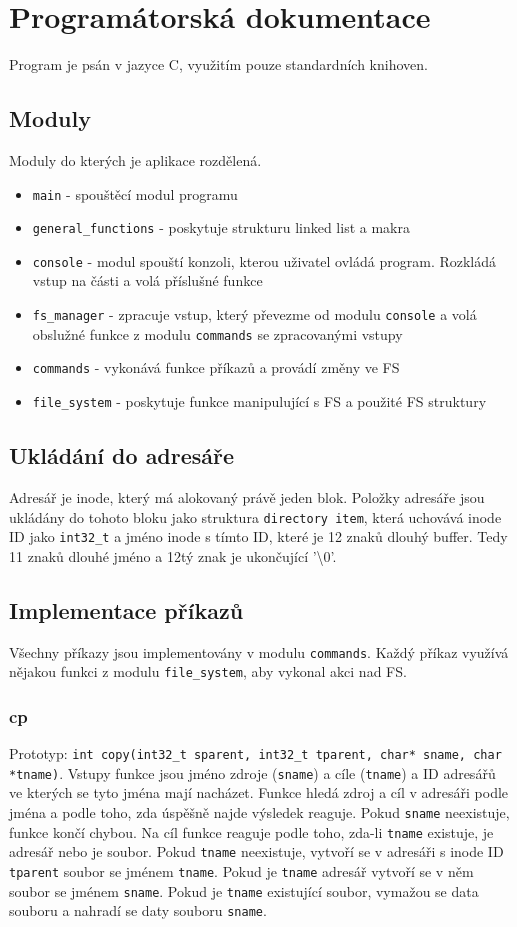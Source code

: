 \documentclass[12pt]{report}
\begin{document}
\chapter{Programátorská dokumentace}
Program je psán v jazyce C, využitím pouze standardních knihoven.
%
\section{Moduly}
Moduly do kterých je aplikace rozdělená.
\begin{itemize}
	\item \texttt{main} - spouštěcí modul programu
	\item \texttt{general\_functions} - poskytuje strukturu linked list a makra
	\item \texttt{console} - modul spouští konzoli, kterou uživatel ovládá program.
		Rozkládá vstup na části a volá příslušné funkce
	\item \texttt{fs\_manager} - zpracuje vstup, který převezme od modulu \texttt{console} a volá
		obslužné funkce z modulu \texttt{commands} se zpracovanými vstupy
	\item \texttt{commands} - vykonává funkce příkazů a provádí změny ve FS
	\item \texttt{file\_system} - poskytuje funkce manipulující s FS a použité FS struktury
\end{itemize}
%
\section{Ukládání do adresáře}
Adresář je inode, který má alokovaný právě jeden blok. Položky adresáře jsou ukládány do tohoto bloku jako
struktura \texttt{directory item},
která uchovává inode ID jako \texttt{int32\_t}  a jméno inode s tímto ID, které je 12 znaků dlouhý buffer.
Tedy 11 znaků dlouhé jméno a 12tý znak je ukončující '\textbackslash 0'.
%
\section{Implementace příkazů}
Všechny příkazy jsou implementovány v modulu \texttt{commands}. Každý příkaz využívá nějakou funkci z
modulu \texttt{file\_system}, aby vykonal akci nad FS.
\subsection{cp}
Prototyp: \texttt{int copy(int32\_t sparent, int32\_t tparent, char* sname, char *tname)}. Vstupy funkce
jsou jméno zdroje (\texttt{sname}) a cíle (\texttt{tname}) a ID adresářů ve kterých se tyto jména mají nacházet. Funkce 
hledá zdroj a cíl v adresáři podle jména a podle toho, zda úspěšně najde výsledek reaguje. Pokud \texttt{sname}
neexistuje, funkce končí chybou. Na cíl funkce reaguje podle toho, zda-li \texttt{tname} existuje, je adresář nebo
je soubor. Pokud \texttt{tname} neexistuje, vytvoří se v adresáři s inode ID \texttt{tparent} soubor se jménem \texttt{tname}.
Pokud je \texttt{tname} adresář vytvoří se v něm soubor se jménem \texttt{sname}. Pokud je \texttt{tname}
existující soubor, vymažou se data souboru a nahradí se daty souboru \texttt{sname}.
\end{document}
